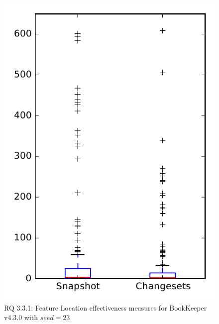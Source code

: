 
\begin{figure}
\centering
\includegraphics[height=0.4\textheight]{figures/flt_seed/rq1_bookkeeper_23}
\caption{RQ 3.3.1: Feature Location effectiveness measures for BookKeeper v4.3.0 with $seed=23$}
\label{fig:flt_seed:rq1:bookkeeper}
\end{figure}

